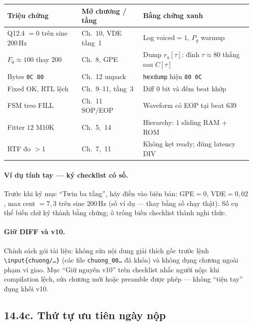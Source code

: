 \begin{center}\small
\begin{tabularx}{\textwidth}{@{}>{\raggedright\arraybackslash}p{3.4cm}>{\raggedright\arraybackslash}X>{\raggedright\arraybackslash}X@{}}\toprule
Triệu chứng & Mở chương / tầng & Bằng chứng xanh \\
\midrule
Q12.4 $=0$ trên sine $200\,\text{Hz}$ & Ch.~10, VDE tầng~1 & Log voiced$=1$, $P_g$ warmup \\
$F_0\approx 100$ thay $200$ & Ch.~8, GPE & Dump $r_a[\tau]$: đỉnh $\tau\approx 80$ thắng sau $C[\tau]$ \\
Bytes \texttt{0C 80} & Ch.~12 unpack & \texttt{hexdump} hiện \texttt{80 0C} \\
Fixed OK, RTL lệch & Ch.~9--11, tầng~3 & Diff $0$ bit và đếm beat khớp \\
FSM treo FILL & Ch.~11 SOP/EOP & Waveform có EOP tại beat $639$ \\
Fitter $12$ M10K & Ch.~5,~14 & Hierarchy: $1$ sliding RAM + ROM \\
RTF đo $>1$ & Ch.~7,~11 & Không kẹt ready; đúng latency DIV \\
\bottomrule
\end{tabularx}
\end{center}

\paragraph{Ví dụ tính tay --- ký checklist có số.} Trước khi ký mục ``Twin ba tầng'', hãy điền vào biên bản: GPE$=0$, VDE$=0{,}02$, max cent $=7{,}3$ trên sine $200\,\text{Hz}$ (số ví dụ --- thay bằng số chạy thật). Số cụ thể biến chữ ký thành bằng chứng; ô trống biến checklist thành nghi thức.

\paragraph{Giữ DIFF và v10.} Chính sách gói tài liệu: không sửa nội dung giải thích gốc trước lệnh \texttt{\textbackslash input\{chuong/\ldots\}} (các file \texttt{chuong\_00\ldots} đã khóa) và không đụng chương ngoài phạm vi giao. Mục ``Giữ nguyên v10'' trên checklist nhắc người nộp: khi compilation lệch, sửa chương mới hoặc preamble được phép --- không ``tiện tay'' đụng khối v10.

\subsection*{14.4c. Thứ tự ưu tiên ngày nộp}

